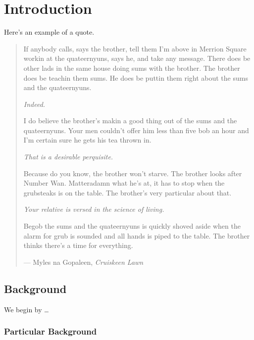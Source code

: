 %
%
%
%

\chapter{Introduction}\label{C.intro}



Here's an example of a quote.

\begin{quote}
If anybody calls, says the brother, tell them I'm above in Merrion Square workin at the
quateernyuns, says he, and take any message.  There does be other lads in the same house
doing sums with the brother.  The brother does be teachin them sums.  He does be puttin
them right about the sums and the quateernyuns.

\textit{Indeed.}

I do believe the brother's makin a good thing out of the sums and the quateernyuns.  Your
men couldn't offer him less than five bob an hour and I'm certain sure he gets his tea
thrown in.

\textit{That is a desirable perquisite.}

Because do you know, the brother won't starve.  The brother looks after Number Wan.
Matteradamn what he's at, it has to stop when the grubsteaks is on the table.  The brother's
very particular about that.

\textit{Your relative is versed in the science of living.}

Begob the sums and the quateernyuns is quickly shoved aside when the alarm for grub is sounded
and all hands is piped to the table.  The brother thinks there's a time for everything.

\hspace{2cm}--- Myles na Gopaleen, \emph{Cruiskeen Lawn}
\end{quote}


\section{Background}\label{S.intro1}

We begin by \ldots

\subsection{Particular Background}\label{SS.xyz}

